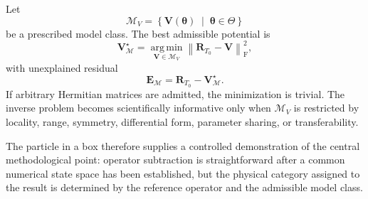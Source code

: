 Let
\begin{equation}
    \mathcal M_V
    =
    \left\{
        \mathbf V(\boldsymbol\theta)
        \;\middle|\;
        \boldsymbol\theta\in\Theta
    \right\}
\end{equation}
be a prescribed model class. The best admissible potential is
\begin{equation}
    \mathbf V_{\mathcal M}^{\star}
    =
    \operatorname*{arg\,min}_{\mathbf V\in\mathcal M_V}
    \left\lVert
        \mathbf R_{T_0}-\mathbf V
    \right\rVert_{\mathrm F}^2,
\end{equation}
with unexplained residual
\begin{equation}
    \mathbf E_{\mathcal M}
    =
    \mathbf R_{T_0}
    -
    \mathbf V_{\mathcal M}^{\star}.
\end{equation}
If arbitrary Hermitian matrices are admitted, the minimization is trivial. The
inverse problem becomes scientifically informative only when $\mathcal M_V$ is
restricted by locality, range, symmetry, differential form, parameter sharing,
or transferability.

The particle in a box therefore supplies a controlled demonstration of the
central methodological point: operator subtraction is straightforward after a
common numerical state space has been established, but the physical category
assigned to the result is determined by the reference operator and the
admissible model class.
